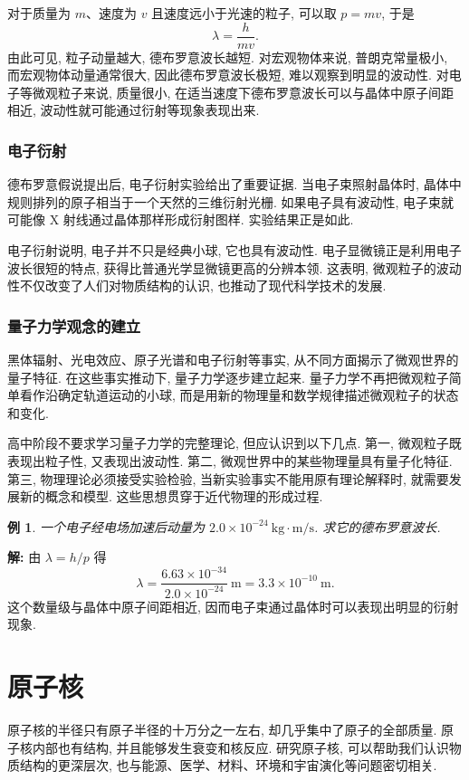 \documentclass[UTF8,openany,fontset=fandol]{ctexbook}
\theoremstyle{chinesetextbook}
\newtheorem{example}{例}[chapter]
\newenvironment{solution}{\par\indent\textbf{解:} \ignorespaces}{\par}
\newcommand{\unit}[1]{\ \mathrm{#1}}
\begin{document}
对于质量为 $m$、速度为 $v$ 且速度远小于光速的粒子, 可以取 $p=mv$, 于是
\[
\lambda=\frac{h}{mv}.
\]
由此可见, 粒子动量越大, 德布罗意波长越短. 对宏观物体来说, 普朗克常量极小, 而宏观物体动量通常很大, 因此德布罗意波长极短, 难以观察到明显的波动性. 对电子等微观粒子来说, 质量很小, 在适当速度下德布罗意波长可以与晶体中原子间距相近, 波动性就可能通过衍射等现象表现出来.
\subsection{电子衍射}
德布罗意假说提出后, 电子衍射实验给出了重要证据. 当电子束照射晶体时, 晶体中规则排列的原子相当于一个天然的三维衍射光栅. 如果电子具有波动性, 电子束就可能像 X 射线通过晶体那样形成衍射图样. 实验结果正是如此.

电子衍射说明, 电子并不只是经典小球, 它也具有波动性. 电子显微镜正是利用电子波长很短的特点, 获得比普通光学显微镜更高的分辨本领. 这表明, 微观粒子的波动性不仅改变了人们对物质结构的认识, 也推动了现代科学技术的发展.
\subsection{量子力学观念的建立}
黑体辐射、光电效应、原子光谱和电子衍射等事实, 从不同方面揭示了微观世界的量子特征. 在这些事实推动下, 量子力学逐步建立起来. 量子力学不再把微观粒子简单看作沿确定轨道运动的小球, 而是用新的物理量和数学规律描述微观粒子的状态和变化.

高中阶段不要求学习量子力学的完整理论, 但应认识到以下几点. 第一, 微观粒子既表现出粒子性, 又表现出波动性. 第二, 微观世界中的某些物理量具有量子化特征. 第三, 物理理论必须接受实验检验, 当新实验事实不能用原有理论解释时, 就需要发展新的概念和模型. 这些思想贯穿于近代物理的形成过程.
\begin{example}
一个电子经电场加速后动量为 $2.0\times10^{-24}\unit{kg\cdot m/s}$. 求它的德布罗意波长.
\end{example}
\begin{solution}
由 $\lambda=h/p$ 得
\[
\lambda=\frac{6.63\times10^{-34}}{2.0\times10^{-24}}\unit{m}=3.3\times10^{-10}\unit{m}.
\]
这个数量级与晶体中原子间距相近, 因而电子束通过晶体时可以表现出明显的衍射现象.
\end{solution}
\chapter{原子核}
原子核的半径只有原子半径的十万分之一左右, 却几乎集中了原子的全部质量. 原子核内部也有结构, 并且能够发生衰变和核反应. 研究原子核, 可以帮助我们认识物质结构的更深层次, 也与能源、医学、材料、环境和宇宙演化等问题密切相关.
\end{document}
